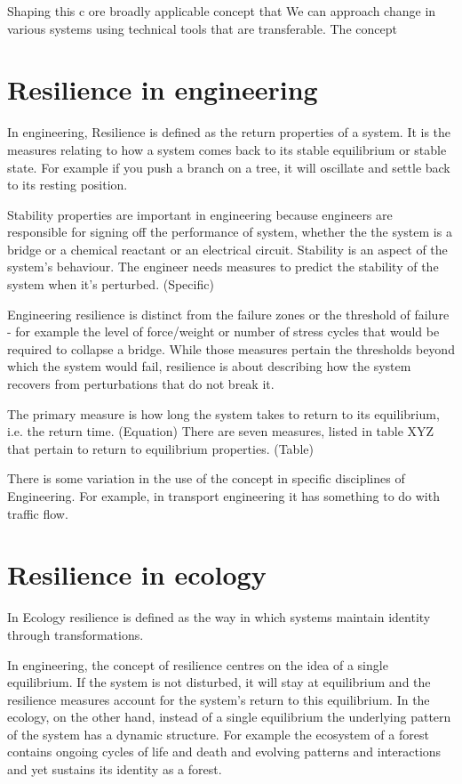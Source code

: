 Shaping this c
ore broadly applicable concept that 
We can approach change in various systems using technical tools that are transferable. 
The concept 

\section{Resilience in engineering}

In engineering, Resilience is defined as the return properties of a system. 
It is the measures relating to how a system comes back to its stable equilibrium or stable state. For example if you push a branch on a tree, it will oscillate and settle back to its resting position. 

Stability properties are important in engineering because engineers are responsible for signing off the performance of system, whether the the system is a bridge or a chemical reactant or an electrical circuit. Stability is an aspect of the system’s behaviour. The engineer needs measures to predict the stability of the system when it's perturbed. (Specific) 

Engineering resilience is distinct from the failure zones or the threshold of failure - for example the level of force/weight or number of stress cycles that would be required to collapse a bridge. While those measures pertain the thresholds beyond which the system would fail, resilience is about describing how the system recovers from perturbations that do not break it. 

The primary measure is how long the system takes to return to its equilibrium, i.e. the return time. (Equation) There are seven measures, listed in table XYZ that pertain to return to equilibrium properties.  (Table)

There is some variation in the use of the concept in specific disciplines of Engineering. For example, in transport engineering it has something to do with traffic flow.

\section{Resilience in ecology}

In Ecology resilience is defined as the way in which systems maintain identity through transformations. 

In engineering, the concept of resilience centres on the idea of a single equilibrium. If the system is not disturbed, it will stay at equilibrium and the resilience measures account for the system’s return to this equilibrium. In the ecology, on the other hand, instead of a single equilibrium the underlying pattern of the system has a dynamic structure. For example the ecosystem of a forest contains ongoing cycles of life and death and evolving patterns and interactions and yet sustains its identity as a forest. 

